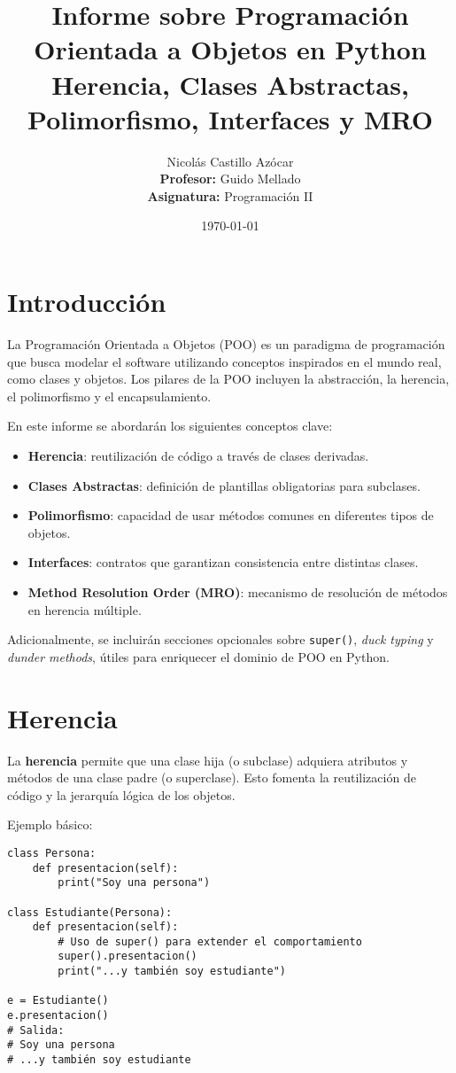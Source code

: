 \documentclass[a4paper,12pt]{article}
\title{\Huge Informe sobre Programación Orientada a Objetos en Python \\[0.2cm]
\large Herencia, Clases Abstractas, Polimorfismo, Interfaces y MRO}
\author{Nicolás Castillo Azócar \\[0.2cm]
\textbf{Profesor:} Guido Mellado \\[0.2cm]
\textbf{Asignatura:} Programación II}
\date{\today}
\begin{document}
\maketitle
\thispagestyle{empty}
\newpage

\tableofcontents
\newpage

\section{Introducción}
La Programación Orientada a Objetos (POO) es un paradigma de programación que busca modelar el software utilizando conceptos inspirados en el mundo real, como clases y objetos.  
Los pilares de la POO incluyen la abstracción, la herencia, el polimorfismo y el encapsulamiento.  

En este informe se abordarán los siguientes conceptos clave:
\begin{itemize}
    \item \textbf{Herencia}: reutilización de código a través de clases derivadas.
    \item \textbf{Clases Abstractas}: definición de plantillas obligatorias para subclases.
    \item \textbf{Polimorfismo}: capacidad de usar métodos comunes en diferentes tipos de objetos.
    \item \textbf{Interfaces}: contratos que garantizan consistencia entre distintas clases.
    \item \textbf{Method Resolution Order (MRO)}: mecanismo de resolución de métodos en herencia múltiple.
\end{itemize}

Adicionalmente, se incluirán secciones opcionales sobre \texttt{super()}, \textit{duck typing} y \textit{dunder methods}, útiles para enriquecer el dominio de POO en Python.

\section{Herencia}
La \textbf{herencia} permite que una clase hija (o subclase) adquiera atributos y métodos de una clase padre (o superclase). Esto fomenta la reutilización de código y la jerarquía lógica de los objetos.

Ejemplo básico:

\begin{lstlisting}
class Persona:
    def presentacion(self):
        print("Soy una persona")

class Estudiante(Persona):
    def presentacion(self):
        # Uso de super() para extender el comportamiento
        super().presentacion()
        print("...y también soy estudiante")

e = Estudiante()
e.presentacion()
# Salida:
# Soy una persona
# ...y también soy estudiante
\end{lstlisting}
\end{document}
